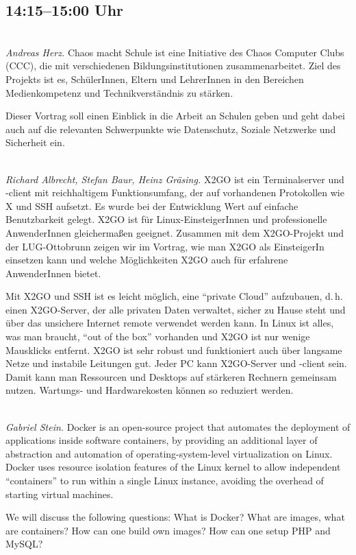 \documentclass[10pt,a4paper,ngerman]{scrartcl}
\let\origdescription\description
\renewenvironment{description}{
  \setlength{\leftmargini}{0em}
  \origdescription
  \setlength{\itemindent}{0em}
  \setlength{\itemsep}{1.2em}
  \setlength{\labelsep}{\textwidth}
}
{\endlist}
\newcommand{\vorschub}{\mbox{}\\[-0.5em]}
\begin{document}
\begin{multicols}{2}
\vfill

\columnbreak

\section{14:15--15:00 Uhr}

\begin{description}
\item[Chaos macht Schule]\vorschub
\textsl{Andreas Herz.}
Chaos macht Schule ist eine Initiative des Chaos Computer Clubs (CCC), die mit verschiedenen Bildungsinstitutionen zusammenarbeitet. Ziel des Projekts ist es, SchülerInnen, Eltern und LehrerInnen in den Bereichen Medienkompetenz und Technikverständnis zu stärken.

Dieser Vortrag soll einen Einblick in die Arbeit an Schulen geben und geht dabei auch auf die relevanten Schwerpunkte wie Datenschutz, Soziale Netzwerke und Sicherheit ein.



\item[X2GO in Theorie und Praxis]\vorschub
\textsl{Richard Albrecht, Stefan Baur, Heinz Gräsing.}
X2GO ist ein Terminalserver und -client mit reichhaltigem Funktionsumfang, der auf vorhandenen Protokollen wie X und SSH aufsetzt. Es wurde bei der Entwicklung Wert auf einfache Benutzbarkeit gelegt. X2GO ist für Linux-EinsteigerInnen und professionelle AnwenderInnen gleichermaßen geeignet. Zusammen mit dem X2GO-Projekt und der LUG-Ottobrunn zeigen wir im Vortrag, wie man X2GO als EinsteigerIn einsetzen kann und welche Möglichkeiten X2GO auch für erfahrene AnwenderInnen bietet.

Mit X2GO und SSH ist es leicht möglich, eine "`private Cloud"' aufzubauen, d.\,h. einen X2GO-Server, der alle privaten Daten verwaltet, sicher zu Hause steht und über das unsichere Internet remote verwendet werden kann. In Linux ist alles, was man braucht, "`out of the box"' vorhanden und X2GO ist nur wenige Mausklicks entfernt. X2GO ist sehr robust und funktioniert auch über langsame Netze und instabile Leitungen gut.
Jeder PC kann X2GO-Server und -client sein. Damit kann man Ressourcen und Desktops auf stärkeren Rechnern gemeinsam nutzen. Wartungs- und Hardwarekosten können so reduziert werden.


\item[Docker for Everyday]\vorschub
\textsl{Gabriel Stein.}
Docker is an open-source project that automates the deployment of applications inside software containers, by providing an additional layer of abstraction and automation of operating-system-level virtualization on Linux. Docker uses resource isolation features of the Linux kernel to allow independent ``containers'' to run within a single Linux instance, avoiding the overhead of starting virtual machines.

We will discuss the following questions: What is Docker? What are images, what are containers? How can one build own images? How can one setup PHP and MySQL?


\end{description}

\end{multicols}
\end{document}
